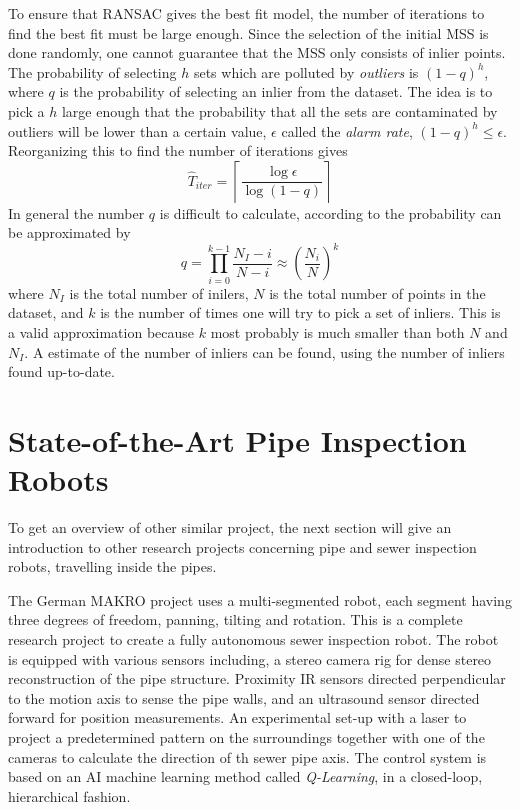 To ensure that RANSAC gives the best fit model, the number of iterations to find the best
fit must be large enough. Since the selection of the initial MSS is done randomly, one
cannot guarantee that the MSS only consists of inlier points. The probability of
selecting $h$ sets which are polluted by \emph{outliers} is $(1 - q)^h$, where $q$ is the
probability of selecting an inlier from the dataset. The idea is to pick a $h$ large enough that the
probability that all the sets are contaminated by outliers will be lower than a certain
value, $\epsilon$ called the \emph{alarm rate}, $(1 - q)^h \leq \epsilon$. Reorganizing
this to find the number of iterations gives
\begin{equation}
    \hat{T}_{iter} = \left \lceil \frac{\log \epsilon}{\log (1 - q)} \right\rceil
\end{equation}
In general the number $q$ is difficult to calculate, according to \cite{ransac-dummies}
the probability can be approximated by 
\begin{equation}
    q = \prod_{i = 0}^{k-1} \frac{N_I - i}{N - i} \approx \left ( \frac{N_i}{N} \right)^k
\end{equation}
where $N_I$ is the total number of inilers, $N$ is the total number of points in the
dataset, and $k$ is the number of times one will try to pick a set of inliers. This is a
valid approximation because $k$ most probably is much smaller than both $N$ and $N_I$. A
estimate of the number of inliers can be found, using the number of inliers found
up-to-date. \cite{ransac-dummies}


\section{State-of-the-Art Pipe Inspection Robots}
\label{chap2:sec-state-of-the-art}
To get an overview of other similar project, the next section will give an introduction to
other research projects concerning pipe and sewer inspection robots, travelling inside the
pipes. 

The German MAKRO project \cite{MAKRO-project} uses a multi-segmented robot, each segment 
having three degrees of freedom, panning, tilting and rotation. This is a complete
research project to create a fully autonomous sewer inspection robot. The robot is
equipped with various sensors including, a stereo camera rig for dense stereo
reconstruction of the pipe structure. Proximity IR sensors directed perpendicular to the
motion axis to sense the pipe walls, and an ultrasound sensor directed forward for
position measurements. An experimental set-up with a laser to project a predetermined
pattern on the surroundings together with one of the cameras to calculate the direction of
th sewer pipe axis. The control system is based on an AI machine learning method called \emph{Q-Learning}, in
a closed-loop, hierarchical fashion.


